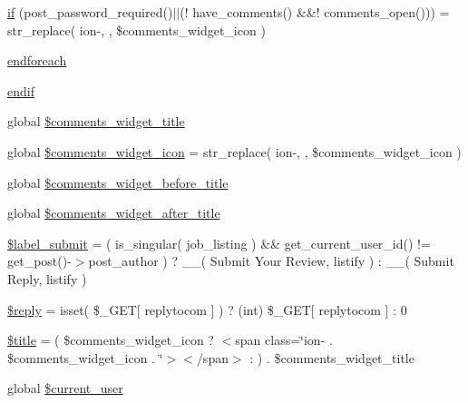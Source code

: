 \begin{DoxyCompactItemize}
\item 
\hyperlink{comments__template_8php_aa69d65d13534429621eba50597158c85}{if} (post\+\_\+password\+\_\+required()$\vert$$\vert$(! have\+\_\+comments() \&\&! comments\+\_\+open())) = str\+\_\+replace( \textquotesingle{}ion-\/\textquotesingle{}, \textquotesingle{}\textquotesingle{}, \$comments\+\_\+widget\+\_\+icon )
\item 
\hyperlink{comments__template_8php_a672d9707ef91db026c210f98cc601123}{endforeach}
\item 
\hyperlink{comments__template_8php_a82cd33ca97ff99f2fcc5e9c81d65251b}{endif}
\item 
global \hyperlink{comments__template_8php_afc780c7283ff3743e92f9268ccad9bd3}{\$comments\+\_\+widget\+\_\+title}
\item 
global \hyperlink{comments__template_8php_a68374f7fb462305d6b7ffc2bd3ebdee6}{\$comments\+\_\+widget\+\_\+icon} = str\+\_\+replace( \textquotesingle{}ion-\/\textquotesingle{}, \textquotesingle{}\textquotesingle{}, \$comments\+\_\+widget\+\_\+icon )
\item 
global \hyperlink{comments__template_8php_ac5d4b088e49d4867c55ecad52ca4e864}{\$comments\+\_\+widget\+\_\+before\+\_\+title}
\item 
global \hyperlink{comments__template_8php_ad701a500377890cfe965100bdfe3fc98}{\$comments\+\_\+widget\+\_\+after\+\_\+title}
\item 
\hyperlink{comments__template_8php_a76b7e8c0cc26d2287e8b1f4515421721}{\$label\+\_\+submit} = ( is\+\_\+singular( \textquotesingle{}job\+\_\+listing\textquotesingle{} ) \&\& get\+\_\+current\+\_\+user\+\_\+id() != get\+\_\+post()-\/$>$post\+\_\+author ) ? \+\_\+\+\_\+( \textquotesingle{}Submit Your Review\textquotesingle{}, \textquotesingle{}listify\textquotesingle{} ) \+: \+\_\+\+\_\+( \textquotesingle{}Submit Reply\textquotesingle{}, \textquotesingle{}listify\textquotesingle{} )
\item 
\hyperlink{comments__template_8php_a46ad7c5fff64ab9b49b9cfcaff650baa}{\$reply} = isset( \$\+\_\+\+G\+ET\mbox{[} \textquotesingle{}replytocom\textquotesingle{} \mbox{]} ) ? (int) \$\+\_\+\+G\+ET\mbox{[} \textquotesingle{}replytocom\textquotesingle{} \mbox{]} \+: 0
\item 
\hyperlink{comments__template_8php_ada57e7bb7c152edad18fe2f166188691}{\$title} = ( \$comments\+\_\+widget\+\_\+icon ? \textquotesingle{}$<$span class=\char`\"{}ion-\/\textquotesingle{} . \$comments\+\_\+widget\+\_\+icon . \textquotesingle{}\char`\"{}$>$$<$/span$>$\textquotesingle{} \+: \textquotesingle{}\textquotesingle{} ) . \$comments\+\_\+widget\+\_\+title
\item 
global \hyperlink{comments__template_8php_a9ec72f91f0de7353b417cfeb60b0df86}{\$current\+\_\+user}
\end{DoxyCompactItemize}


